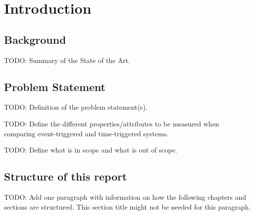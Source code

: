 \chapter{Introduction}

\section{Background}
TODO: Summary of the State of the Art.

\section{Problem Statement}
TODO: Definition of the problem statement(s).

TODO: Define the different properties/attributes to be measured when comparing
event-triggered and time-triggered systems.

TODO: Define what is in scope and what is out of scope.

\section{Structure of this report}
TODO: Add one paragraph with information on how the following chapters and
sections are structured. This section title might not be needed for this
paragraph.
